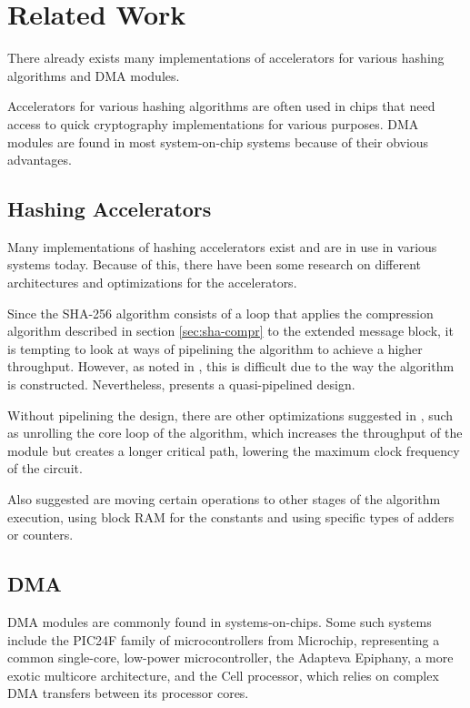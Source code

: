 \chapter{Related Work}
\label{cha:related-work}

There already exists many implementations of accelerators for various hashing
algorithms and DMA modules.

Accelerators for various hashing algorithms are often used in chips that need
access to quick cryptography implementations for various purposes. DMA modules are
found in most system-on-chip systems because of their obvious advantages.

\section{Hashing Accelerators}
\label{sec:previous-hash}
Many implementations of hashing accelerators exist and are in use in various
systems today. Because of this, there have been some research on different
architectures and optimizations for the accelerators.

Since the SHA-256 algorithm consists of a loop that applies the compression
algorithm described in section \ref{sec:sha-compr} to the extended message
block, it is tempting to look at ways of pipelining the algorithm to achieve
a higher throughput. However, as noted in \cite{sha-opt}, this is difficult
due to the way the algorithm is constructed. Nevertheless, \cite{dadda-sha}
presents a quasi-pipelined design.

Without pipelining the design, there are other optimizations suggested in
\cite{sha-opt}, such as unrolling the core loop of the algorithm, which
increases the throughput of the module but creates a longer critical path,
lowering the maximum clock frequency of the circuit.

Also suggested are moving certain operations to other stages of the algorithm
execution, using block RAM for the constants and using specific types of
adders or counters.

\section{DMA}
DMA modules are commonly found in systems-on-chips. Some such systems include the
PIC24F family of microcontrollers from Microchip, representing a common
single-core, low-power microcontroller, the Adapteva Epiphany, a more
exotic multicore architecture, and the Cell processor, which relies on complex DMA transfers between its processor cores.

